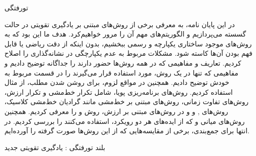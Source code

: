 


\pagestyle{empty}

‌تورفتگی

 در این پایان نامه، به معرفی برخی از روش‌های مبتنی بر یادگیری تقویتی در حالت گسسته می‌پردازیم و الگوریتم‌های مهم آن را مرور خواهیم‌کرد. 
هدف ما این بود که به روش‌های موجود ساختاری یکپارچه و رسمی ببخشیم،
 بدون اینکه از دقت ریاضی یا قابل فهم بودن آن‌ها کاسته شود.
 مشکلات مربوط به عدم یکپارچگی در نشانه‌گذاری را اصلاح کردیم.
 تعاریف و مفاهیمی که در همه روش‌ها حضور دارند را جداگانه توضیح دادیم و مفاهیمی که تنها در یک روش، مورد استفاده قرار می‌گیرند را در قسمت مربوط به خودش توضیح دادیم.
همچنین در مواقع لزوم، برای روشن شدن مطلب، از مثال استفاده کردیم.
روش‌های برنامه‌ریزی پویا، شامل تکرار خط‌مشی و تکرار ارزش، روش‌های تفاوت زمانی، روش‌های مبتنی بر خط‌مشی مانند گرادیان خط‌مشی کلاسیک، روش‌های 
,
و
و در روش‌های مبتنی بر ارزش، روش
و
را معرفی کردیم. همچنین روش‌های میانی 
و
که از ایده‌های هر دو رویکرد، استفاده می‌کنند را بررسی کردیم.
در انتها برای جمع‌بندی، برخی از مقایسه‌هایی که از این روش‌ها صورت گرفته را آورده‌ایم.


‌بلند
‌تورفتگی : 
یادگیری تقویتی
‌جدید
